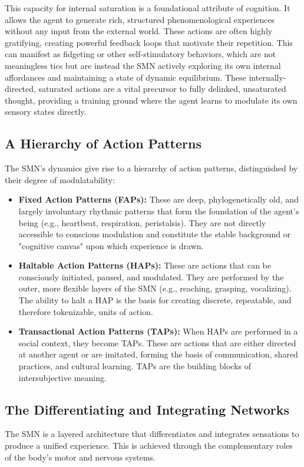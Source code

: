 This capacity for internal saturation is a foundational attribute of cognition. It allows the agent to generate rich, structured phenomenological experiences without any input from the external world. These actions are often highly gratifying, creating powerful feedback loops that motivate their repetition. This can manifest as fidgeting or other self-stimulatory behaviors, which are not meaningless tics but are instead the SMN actively exploring its own internal affordances and maintaining a state of dynamic equilibrium. These internally-directed, saturated actions are a vital precursor to fully delinked, unsaturated thought, providing a training ground where the agent learns to modulate its own sensory states directly.

\subsection*{A Hierarchy of Action Patterns}
The SMN's dynamics give rise to a hierarchy of action patterns, distinguished by their degree of modulatability:
\begin{itemize}
    \item \textbf{Fixed Action Patterns (FAPs):} These are deep, phylogenetically old, and largely involuntary rhythmic patterns that form the foundation of the agent's being (e.g., heartbeat, respiration, peristalsis). They are not directly accessible to conscious modulation and constitute the stable background or "cognitive canvas" upon which experience is drawn.
    \item \textbf{Haltable Action Patterns (HAPs):} These are actions that can be consciously initiated, paused, and modulated. They are performed by the outer, more flexible layers of the SMN (e.g., reaching, grasping, vocalizing). The ability to halt a HAP is the basis for creating discrete, repeatable, and therefore tokenizable, units of action.
    \item \textbf{Transactional Action Patterns (TAPs):} When HAPs are performed in a social context, they become TAPs. These are actions that are either directed at another agent or are imitated, forming the basis of communication, shared practices, and cultural learning. TAPs are the building blocks of intersubjective meaning.
\end{itemize}

\subsection*{The Differentiating and Integrating Networks}
The SMN is a layered architecture that differentiates and integrates sensations to produce a unified experience. This is achieved through the complementary roles of the body's motor and nervous systems.

